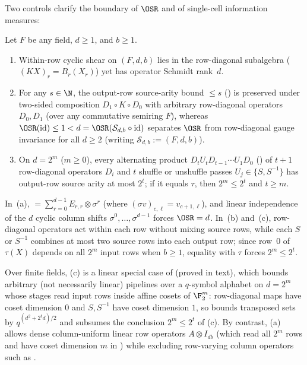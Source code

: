 Two controls clarify the boundary of $\OSR$ and of single-cell information measures:

\begin{proposition}[Within-row shear $\OSR = d$ and row-diagonal source-arity preservation]\label{prop:shear-control}
Let $F$ be any field, $d \ge 1$, and $b \ge 1$.
\begin{enumerate}[label=(\alph*)]
\item Within-row cyclic shear  on $(F, d, b)$ lies in the row-diagonal subalgebra
   ($(KX)_r = B_r(X_r)$) yet has operator Schmidt rank~$d$.
\item For any $s \in \N$, the output-row source-arity bound $\le s$ ()
  is preserved under two-sided composition $D_1 \circ K \circ D_0$ with arbitrary row-diagonal
  operators $D_0, D_1$ (over any commutative semiring $F$), whereas $\OSR(\mathrm{id}) \le 1 < d =
  \OSR(\mathcal{S}_{d,b} \circ \mathrm{id})$ separates $\OSR$ from row-diagonal gauge invariance for
  all $d \ge 2$ (writing $\mathcal{S}_{d,b} := {}$$(F, d, b)$).
\item On $d = 2^m$ ($m \ge 0$), every alternating product $D_t U_t D_{t-1} \cdots U_1 D_0$
  () of $t + 1$ row-diagonal operators $D_i$ and $t$ shuffle or
  unshuffle passes $U_j \in \{S, S^{-1}\}$ has output-row source arity at most $2^t$; if it equals
  $\tau$, then $2^m \le 2^t$ and $t \ge m$.
\end{enumerate}
\end{proposition}
\begin{outline}
In~(a), ${} = \sum_{r=0}^{d-1} E_{r,r} \otimes \sigma^r$ (where
$(\sigma v)_{c,\ell} = v_{c+1,\ell}$), and linear independence
of the $d$ cyclic column shifts $\sigma^0, \dots, \sigma^{d-1}$ forces $\OSR = d$. In~(b) and~(c),
row-diagonal operators act within each row without mixing source rows, while each $S$ or $S^{-1}$
combines at most two source rows into each output row; since row~$0$ of $\tau(X)$ depends on all
$2^m$ input rows when $b \ge 1$, equality with $\tau$ forces $2^m \le 2^t$.
\end{outline}

Over finite fields, (c) is a
linear special case of \cite[Proposition~6.25(a)]{SeventeenthPaper2026} (proved in text), which bounds
arbitrary (not necessarily linear) pipelines over a $q$-symbol alphabet on $d = 2^m$ whose stages read
input rows inside affine cosets of $\F_2^m$: row-diagonal maps have coset dimension $0$ and
$S, S^{-1}$ have coset dimension $1$, so \cite[Proposition~6.25(a)]{SeventeenthPaper2026} bounds
transposed sets by $q^{(d^2 + 2^t d)/2}$ and subsumes the conclusion $2^m \le 2^t$ of
(c).
By contrast, (a) allows dense
column-uniform linear row operators $A \otimes I_{db}$ (which read all $2^m$ rows and have coset
dimension $m$ in \cite[Proposition~6.25(a)]{SeventeenthPaper2026}) while excluding row-varying
column operators such as .

